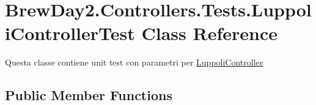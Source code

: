 \hypertarget{class_brew_day2_1_1_controllers_1_1_tests_1_1_luppoli_controller_test}{}\section{Brew\+Day2.\+Controllers.\+Tests.\+Luppoli\+Controller\+Test Class Reference}
\label{class_brew_day2_1_1_controllers_1_1_tests_1_1_luppoli_controller_test}


Questa classe contiene unit test con parametri per \mbox{\hyperlink{class_brew_day2_1_1_controllers_1_1_luppoli_controller}{Luppoli\+Controller}} 


\subsection*{Public Member Functions}
